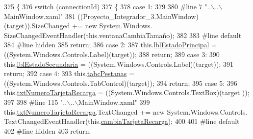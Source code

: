 \begin{DoxyCode}
375                                                                                                 \{
376             \textcolor{keywordflow}{switch} (connectionId)
377             \{
378             \textcolor{keywordflow}{case} 1:
379             
380 \textcolor{preprocessor}{            #line 7 "..\(\backslash\)..\(\backslash\)MainWindow.xaml"}
381 \textcolor{preprocessor}{}            ((Proyecto\_Integrador\_3.MainWindow)(target)).SizeChanged += \textcolor{keyword}{new} System.Windows.
      SizeChangedEventHandler(\textcolor{keyword}{this}.ventanaCambiaTamaño);
382             
383 \textcolor{preprocessor}{            #line default}
384 \textcolor{preprocessor}{}\textcolor{preprocessor}{            #line hidden}
385 \textcolor{preprocessor}{}            \textcolor{keywordflow}{return};
386             \textcolor{keywordflow}{case} 2:
387             this.\hyperlink{class_proyecto___integrador__3_1_1_main_window_a3120ba863f838314aeed5764404c80d5}{lblEstadoPrincipal} = ((System.Windows.Controls.Label)(target));
388             \textcolor{keywordflow}{return};
389             \textcolor{keywordflow}{case} 3:
390             this.\hyperlink{class_proyecto___integrador__3_1_1_main_window_ab3c46fae3b8ee53389013b8cc0426f77}{lblEstadoSecundaria} = ((System.Windows.Controls.Label)(target));
391             \textcolor{keywordflow}{return};
392             \textcolor{keywordflow}{case} 4:
393             this.\hyperlink{class_proyecto___integrador__3_1_1_main_window_a46bffd3bc6bf702252e6568b9c00f35c}{tabcPestanas} = ((System.Windows.Controls.TabControl)(target));
394             \textcolor{keywordflow}{return};
395             \textcolor{keywordflow}{case} 5:
396             this.\hyperlink{class_proyecto___integrador__3_1_1_main_window_a921e64f5a9f1531f12802b32f06bf71b}{txtNumeroTarjetaRecarga} = ((System.Windows.Controls.TextBox)(target
      ));
397             
398 \textcolor{preprocessor}{            #line 115 "..\(\backslash\)..\(\backslash\)MainWindow.xaml"}
399 \textcolor{preprocessor}{}            this.\hyperlink{class_proyecto___integrador__3_1_1_main_window_a921e64f5a9f1531f12802b32f06bf71b}{txtNumeroTarjetaRecarga}.TextChanged += \textcolor{keyword}{new} System.Windows.Controls.
      TextChangedEventHandler(this.\hyperlink{class_proyecto___integrador__3_1_1_main_window_ae62fbb5bc9da0f805d207465ef0ac41a}{cambiaTarjetaRecarga});
400             
401 \textcolor{preprocessor}{            #line default}
402 \textcolor{preprocessor}{}\textcolor{preprocessor}{            #line hidden}
403 \textcolor{preprocessor}{}            \textcolor{keywordflow}{return};

\end{DoxyCode}
